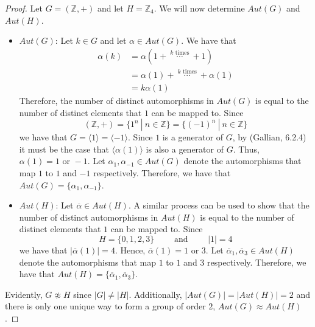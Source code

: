 \documentclass[12pt,reqno]{article}
\newcommand{\Z}{\mathbb{Z}}
\theoremstyle{plain}
\theoremstyle{definition}
\begin{document}
\begin{proof}
    Let \(G=(\Z, +)\) and let \(H=\Z_4\). We will now determine \(Aut(G)\) and \(Aut(H)\).
    \begin{itemize}
        \item \underline{\(Aut(G)\)}: Let \(k\in G\) and let \(\alpha\in Aut(G)\). We have that
        \begin{align*}
            \alpha(k)&=\alpha(1+\ \overset{k\text{ times}}{\cdots}\ +1)\\
            &=\alpha(1)+\ \overset{k\text{ times}}{\cdots}\ +\alpha(1)\\
            &=k\alpha(1)
        \end{align*}
        Therefore, the number of distinct automorphisms
        in \(Aut(G)\) is equal to the number of distinct elements that \(1\) can be mapped to.
        Since \[(\Z,+)=\{1^n\ |\ n\in\Z\}=\{(-1)^n\ |\ n\in\Z\}\]
        we have that \(G=\langle 1\rangle=\langle -1\rangle\). Since \(1\) is a generator of \(G\), by (Gallian, 6.2.4) it must be the case
        that \(\langle\alpha(1)\rangle\) is also a generator of \(G\). Thus, \(\alpha(1)=1\text{ or }-1\). Let \(\alpha_1,\alpha_{-1}\in Aut(G)\)
        denote the automorphisms that map \(1\) to \(1\) and \(-1\) respectively. Therefore, we have that
        \(Aut(G)=\{\alpha_1,\alpha_{-1}\}\).

        \item \underline{\(Aut(H)\)}: Let \(\overline{\alpha}\in Aut(H)\). A similar process can be used to show that the number of distinct automorphisms
        in \(Aut(H)\) is equal to the number of distinct elements that \(1\) can be mapped to. Since
        \[H=\{0,1,2,3\}\qquad\text{ and }\qquad |1|=4\]
        we have that \(|\overline{\alpha}(1)|=4\). Hence, \(\overline{\alpha}(1)=1\text{ or }3\). Let \(\overline{\alpha}_1,\overline{\alpha}_3\in Aut(H)\)
        denote the automorphisms that map \(1\) to \(1\) and \(3\) respectively.
        Therefore, we have that \(Aut(H)=\{\overline{\alpha}_1,\overline{\alpha}_3\}\).
    \end{itemize}

    Evidently, \(G\not\approx H\) since \(|G|\neq|H|\). Additionally, \(|Aut(G)|=|Aut(H)|=2\) and there is only one unique way
    to form a group of order \(2\), \(Aut(G)\approx Aut(H)\).
\end{proof}
\end{document}
